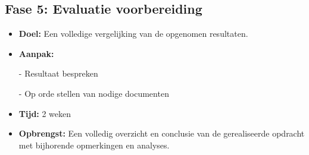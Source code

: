 \subsection{Fase 5: Evaluatie voorbereiding}
\begin{itemize}
    \item \textbf{Doel:}
    Een volledige vergelijking van de opgenomen resultaten.
    \item \textbf{Aanpak:}
    \item[-] Resultaat bespreken
    \item[-] Op orde stellen van nodige documenten
    \item \textbf{Tijd:} 2 weken
    \item \textbf{Opbrengst:}
    Een volledig overzicht en conclusie van de gerealiseerde opdracht met bijhorende opmerkingen en analyses. 
\end{itemize}


